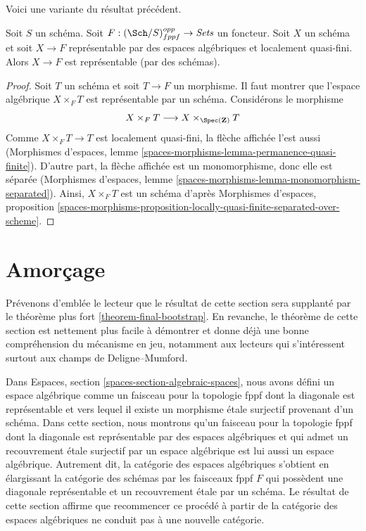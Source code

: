 \noindent
Voici une variante du résultat précédent.

\begin{lemma}
\label{lemma-bootstrap-locally-quasi-finite}
Soit $S$ un schéma. Soit $F : (\Sch/S)_{fppf}^{opp} \to \textit{Sets}$ un
foncteur. Soit $X$ un schéma et soit $X \to F$ représentable par des espaces
algébriques et localement quasi-fini. Alors $X \to F$ est représentable
(par des schémas).
\end{lemma}

\begin{proof}
Soit $T$ un schéma et soit $T \to F$ un morphisme. Il faut montrer que
l'espace algébrique $X \times_F T$ est représentable par un schéma. Considérons
le morphisme
$$
X \times_F T  \longrightarrow X \times_{\Spec(\mathbf{Z})} T
$$
Comme $X \times_F T \to T$ est localement quasi-fini, la flèche affichée
l'est aussi (Morphismes d'espaces, lemme
\ref{spaces-morphisms-lemma-permanence-quasi-finite}).
D'autre part, la flèche affichée est un monomorphisme,
donc elle est séparée (Morphismes d'espaces, lemme
\ref{spaces-morphisms-lemma-monomorphism-separated}).
Ainsi, $X \times_F T$ est un schéma d'après Morphismes d'espaces, proposition
\ref{spaces-morphisms-proposition-locally-quasi-finite-separated-over-scheme}.
\end{proof}











\section{Amorçage}
\label{section-bootstrap}

\noindent
Prévenons d'emblée le lecteur que le résultat de cette section sera
supplanté par le théorème plus fort
\ref{theorem-final-bootstrap}.
En revanche, le théorème de cette section est nettement plus facile à
démontrer et donne déjà une bonne compréhension du mécanisme en jeu,
notamment aux lecteurs qui s'intéressent surtout aux champs de
Deligne--Mumford.

\medskip\noindent
Dans
Espaces, section \ref{spaces-section-algebraic-spaces},
nous avons défini un espace algébrique comme un faisceau pour la topologie fppf
dont la diagonale est représentable et vers lequel il existe un morphisme étale
surjectif provenant d'un schéma. Dans cette section, nous montrons qu'un
faisceau pour la topologie fppf dont la diagonale est représentable par des espaces
algébriques et qui admet un recouvrement étale surjectif par un espace algébrique
est lui aussi un espace algébrique.
Autrement dit, la catégorie des espaces algébriques s'obtient en élargissant la
catégorie des schémas par les faisceaux fppf $F$ qui possèdent une diagonale
représentable et un recouvrement étale par un schéma. Le
résultat de cette section affirme que recommencer ce procédé à partir de
la catégorie des espaces algébriques ne conduit pas à une nouvelle catégorie.

